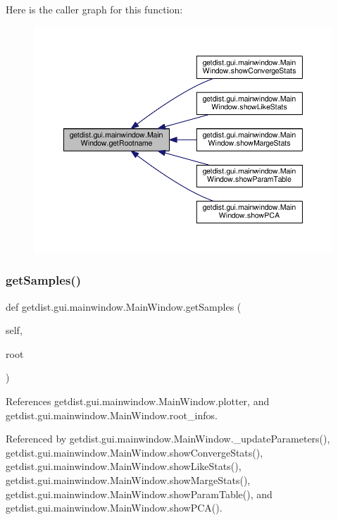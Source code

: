 Here is the caller graph for this function\+:
\nopagebreak
\begin{figure}[H]
\begin{center}
\leavevmode
\includegraphics[width=350pt]{classgetdist_1_1gui_1_1mainwindow_1_1MainWindow_addbd3bf89b07a5176f3daad52ada42c9_icgraph}
\end{center}
\end{figure}
\mbox{\label{classgetdist_1_1gui_1_1mainwindow_1_1MainWindow_aff268010fdbaa0abe118cf5a3b50849f}} 
\subsubsection{\texorpdfstring{get\+Samples()}{getSamples()}}
{\footnotesize\ttfamily def getdist.\+gui.\+mainwindow.\+Main\+Window.\+get\+Samples (\begin{DoxyParamCaption}\item[{}]{self,  }\item[{}]{root }\end{DoxyParamCaption})}



References getdist.\+gui.\+mainwindow.\+Main\+Window.\+plotter, and getdist.\+gui.\+mainwindow.\+Main\+Window.\+root\+\_\+infos.



Referenced by getdist.\+gui.\+mainwindow.\+Main\+Window.\+\_\+update\+Parameters(), getdist.\+gui.\+mainwindow.\+Main\+Window.\+show\+Converge\+Stats(), getdist.\+gui.\+mainwindow.\+Main\+Window.\+show\+Like\+Stats(), getdist.\+gui.\+mainwindow.\+Main\+Window.\+show\+Marge\+Stats(), getdist.\+gui.\+mainwindow.\+Main\+Window.\+show\+Param\+Table(), and getdist.\+gui.\+mainwindow.\+Main\+Window.\+show\+P\+C\+A().

